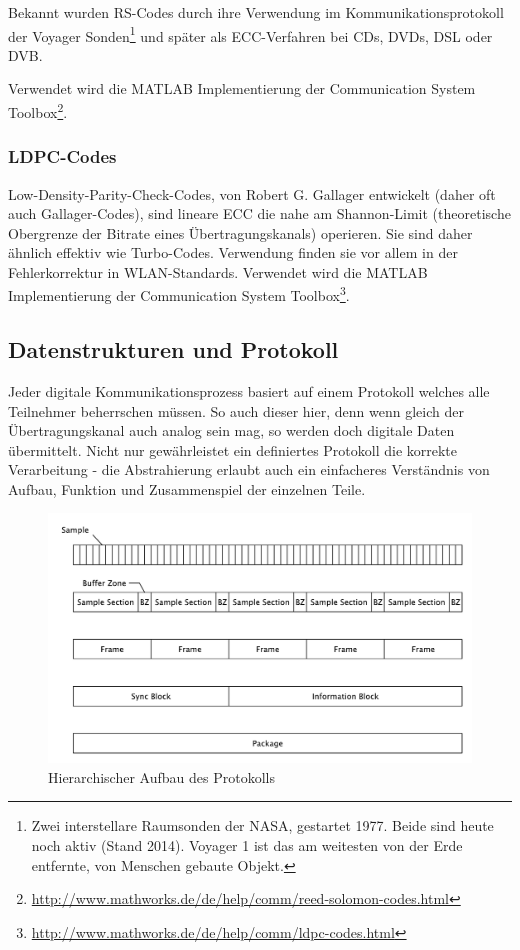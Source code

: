 Bekannt wurden RS-Codes durch ihre Verwendung im Kommunikationsprotokoll der Voyager Sonden\footnote{Zwei interstellare Raumsonden der NASA, gestartet 1977. Beide sind heute noch aktiv (Stand 2014). Voyager 1 ist das am weitesten von der Erde entfernte, von Menschen gebaute Objekt.} und später als ECC-Verfahren bei CDs, DVDs, DSL oder DVB. 

Verwendet wird die MATLAB Implementierung der Communication System Toolbox\footnote{\url{http://www.mathworks.de/de/help/comm/reed-solomon-codes.html}}.

\subsubsection{LDPC-Codes}

Low-Density-Parity-Check-Codes, von  Robert G. Gallager\cite{gallager1962low} entwickelt (daher oft auch Gallager-Codes), sind lineare ECC die nahe am Shannon-Limit (theoretische Obergrenze der Bitrate eines Übertragungskanals) operieren. Sie sind daher ähnlich effektiv wie Turbo-Codes. Verwendung finden sie vor allem in der Fehlerkorrektur in WLAN-Standards.
Verwendet wird die MATLAB Implementierung der Communication System Toolbox\footnote{\url{http://www.mathworks.de/de/help/comm/ldpc-codes.html}}.


\subsection{Datenstrukturen und Protokoll}
\label{sec:protokoll}

Jeder digitale Kommunikationsprozess basiert auf einem Protokoll welches alle Teilnehmer beherrschen müssen. So auch dieser hier, denn wenn gleich der Übertragungskanal auch analog sein mag, so werden doch digitale Daten übermittelt. Nicht nur gewährleistet ein definiertes Protokoll die korrekte Verarbeitung - die Abstrahierung erlaubt auch ein einfacheres Verständnis von Aufbau, Funktion und Zusammenspiel der einzelnen Teile. 

\begin{figure}[h]
	\centering
	\includegraphics[width=\textwidth]{figures/figures-protocol.pdf}
	\caption{Hierarchischer Aufbau des Protokolls}
	\label{fig:protocol}
\end{figure}

